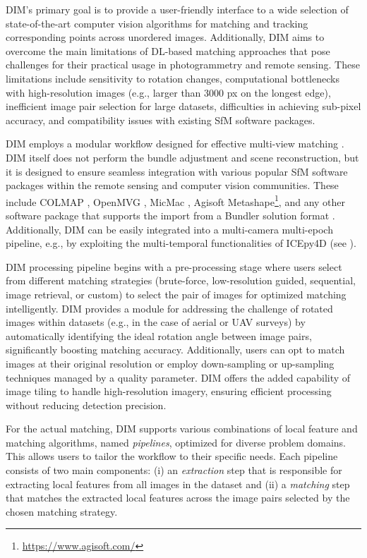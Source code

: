 DIM's primary goal is to provide a user-friendly interface to a wide selection of state-of-the-art computer vision algorithms for matching and tracking corresponding points across unordered images.
Additionally, DIM aims to overcome the main limitations of DL-based matching approaches that pose challenges for their practical usage in photogrammetry and remote sensing. 
These limitations include sensitivity to rotation changes, computational bottlenecks with high-resolution images (e.g., larger than 3000 px on the longest edge), inefficient image pair selection for large datasets, difficulties in achieving sub-pixel accuracy, and compatibility issues with existing SfM software packages.  

DIM employs a modular workflow designed for effective multi-view matching .
DIM itself does not perform the bundle adjustment and scene reconstruction, but it is designed to ensure seamless integration with various popular SfM software packages within the remote sensing and computer vision communities. 
These include COLMAP \citep{schoenberger2016sfm}, OpenMVG \citep{moulon2016openmvg}, MicMac \citep{rupnik2017micmac}, Agisoft Metashape\footnote{\url{https://www.agisoft.com/}}, 
and any other software package that supports the import from a Bundler solution format \citep{Li_Snavely_2018_MegaDepth}.
Additionally, DIM can be easily integrated into a multi-camera multi-epoch pipeline, e.g., by exploiting the multi-temporal functionalities of ICEpy4D (see ).

DIM processing pipeline begins with a pre-processing stage where users select from different matching strategies (brute-force, low-resolution guided, sequential, image retrieval, or custom) to select the pair of images for optimized matching intelligently. 
DIM provides a module for addressing the challenge of rotated images within datasets (e.g., in the case of aerial or UAV surveys) by automatically identifying the ideal rotation angle between image pairs, significantly boosting matching accuracy.
Additionally, users can opt to match images at their original resolution or employ down-sampling or up-sampling techniques managed by a quality parameter.
DIM offers the added capability of image tiling to handle high-resolution imagery, ensuring efficient processing without reducing detection precision. 

For the actual matching, DIM supports various combinations of local feature and matching algorithms, named \textit{pipelines}, optimized for diverse problem domains. 
This allows users to tailor the workflow to their specific needs. 
Each pipeline consists of two main components: (i) an \textit{extraction} step that is responsible for extracting local features from all images in the dataset and (ii) a \textit{matching} step that matches the extracted local features across the image pairs selected by the chosen matching strategy.  

